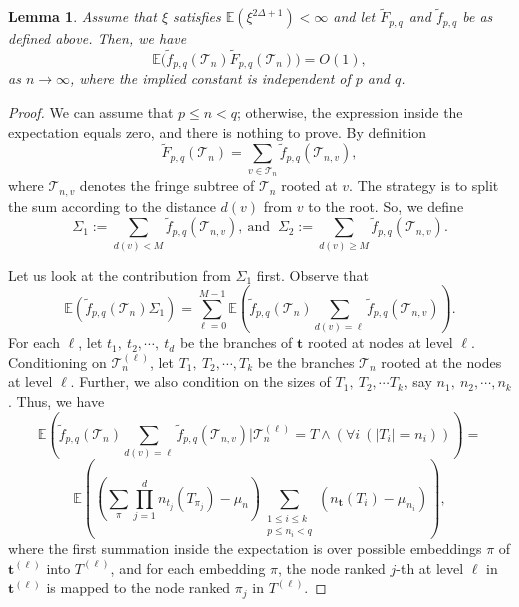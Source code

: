 \documentclass[10pt,a4paper]{amsart}
\newtheorem{lemma}{Lemma}
\newcommand{\E}{\mathbb{E}}
\newcommand{\hF}{\tilde{F}_{p,q}}
\newcommand{\hf}{\tilde{f}_{p,q}}
\newcommand{\n}{n_{\st}}
\newcommand{\st}{\textbf{t}}
\newcommand{\tc}{\mathcal{T}}
\begin{document}
\begin{lemma}\label{lem:toll_add}
	Assume that $\xi$ satisfies $\mathbb{E}(\xi^{2\Delta+1})<\infty$ and let $\hF$ and $\hf$ be as defined above. Then, we have
	\begin{equation}
	\E\big(\hf(\tc_n)\hF(\tc_n)\big)=O(1),
	\end{equation}
 as $n\to\infty$, where the implied constant is independent of $p$ and $q$.
\end{lemma}

\begin{proof}
We can assume that \( p \leq n < q \); otherwise, the expression inside the expectation equals zero, and there is nothing to prove.  By definition
\[
\hF(\tc_n)=\sum_{v\in\tc_n}\hf(\tc_{n,v}),
\]
where $\tc_{n,v}$ denotes the fringe subtree of $\tc_n$ rooted at $v$. The strategy is to split the sum according to the distance $d(v)$ from $v$ to the root. So, we define
	\[
		\Sigma_1 := \sum_{d(v)<M}\hf(\tc_{n,v}), \ \text{and }\  \Sigma_2 := \sum_{d(v)\geq M}\hf(\tc_{n,v}).
	\]
 
Let us look at the contribution from $\Sigma_1$ first. Observe that
\[
\E\left(\hf(\tc_n)\Sigma_1\right) = \sum_{\ell=0}^{M-1}\mathbb{E}\left(\hf(\tc_n)\sum_{d(v)=\ell}\hf(\tc_{n,v})\right).
\]
For each $\ell$, let $t_1, \ t_2, \cdots, \ t_d $ be the branches of $\st$ rooted at nodes at level $\ell$. Conditioning on $\tc_n^{(\ell)}$, let $T_1,\ T_2, \cdots ,T_k$ be the branches $\tc_n$ rooted at the nodes at level $\ell$. Further, we also condition on the sizes of $T_1,\ T_2, \cdots T_k$, say $n_1,\ n_2, \cdots , n_k$. Thus, we have
\[
\mathbb{E}\left(\hf(\tc_n)\sum_{d(v)=\ell}\hf(\tc_{n,v})\Big|\tc_n^{(\ell)}=T \wedge (\forall i \  (|T_i|=n_i)) \right)=
\]
\begin{equation}\label{expectation of centered f, proof}
    \E\left(\left(\sum_{\pi}\prod_{j=1}^{d}n_{t_j}(T_{\pi_j})-\mu_n\right)\sum_{\substack{1\leq i\leq k\\ p\leq n_i <q}}\left(\n(T_i)-\mu_{n_i}\right)\right),
\end{equation}
where the first summation inside the expectation is over possible embeddings $\pi$ of $\st^{(\ell)}$ into $T^{(\ell)}$, and for each embedding $\pi$, the node ranked $j$-th at level $\ell$ in $\st^{(\ell)}$ is mapped to the node ranked $\pi_j$ in $T^{(\ell)}$.


\end{proof}
\end{document}
